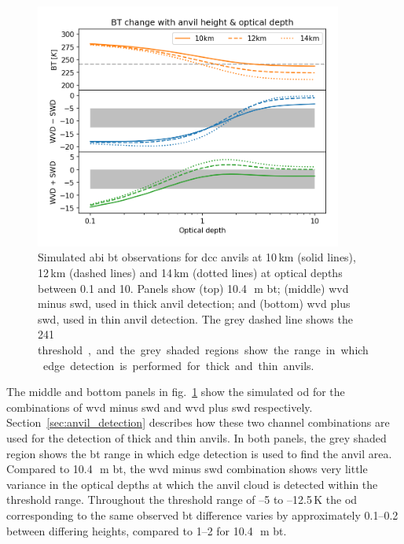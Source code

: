 \begin{figure}[tp]
    \centering
    \includegraphics[width=0.9\textwidth]{figures/chapter3_01.png}
    \caption[
    Simulated \acrshort{abi} \acrshort{bt} observations of \acrshort{dcc} anvils at a range of heights and optical depths for detection of thick and thin anvil detection
    ]{
    Simulated \acrshort{abi} \acrshort{bt} observations for \acrshort{dcc} anvils at 10\,\unit{km} (solid lines), 12\,\unit{km} (dashed lines) and 14\,\unit{km} (dotted lines) at optical depths between 0.1 and 10. Panels show (top) 10.4\,\unit{\mu m} \acrshort{bt}; (middle) \acrshort{wvd} minus \acrshort{swd}, used in thick anvil detection; and (bottom) \acrshort{wvd} plus \acrshort{swd}, used in thin anvil detection. The grey dashed line shows the 241\,\unit[K] threshold, and the grey shaded regions show the range in which edge detection is performed for thick and thin anvils.
    }
    \label{fig:bt_wvd_swd_height_od}
\end{figure}

The middle and bottom panels in fig.~\ref{fig:bt_wvd_swd_height_od} show the simulated \acrshort{od} for the combinations of \acrshort{wvd} minus \acrshort{swd} and \acrshort{wvd} plus \acrshort{swd} respectively.
Section~\ref{sec:anvil_detection} describes how these two channel combinations are used for the detection of thick and thin anvils.
In both panels, the grey shaded region shows the \acrshort{bt} range in which edge detection is used to find the anvil area.
Compared to 10.4\,\unit{\mu m} \acrshort{bt}, the \acrshort{wvd} minus \acrshort{swd} combination shows very little variance in the optical depths at which the anvil cloud is detected within the threshold range.
Throughout the threshold range of --5 to --12.5\,\unit{K} the \acrshort{od} corresponding to the same observed \acrshort{bt} difference varies by approximately 0.1--0.2 between differing heights, compared to 1--2 for 10.4\,\unit{\mu m} \acrshort{bt}.

